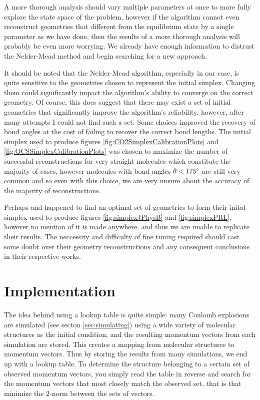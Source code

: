 A more thorough analysis should vary multiple parameters at once to more fully explore the state space of the problem, however if the algorithm cannot even reconstruct geometries that different from the equilibrium state by a single parameter as we have done, then the results of a more thorough analysis will probably be even more worrying. We already have enough information to distrust the Nelder-Mead method and begin searching for a new approach.

It should be noted that the Nelder-Mead algorithm, especially in our case, is quite sensitive to the geometries chosen to represent the initial simplex. Changing them could significantly impact the algorithm's ability to converge on the correct geometry. Of course, this does suggest that there may exist a set of initial geometries that significantly improve the algorithm's reliability, however, after many attempts I could not find such a set. Some choices improved the recovery of bond angles at the cost of failing to recover the correct bond lengths. The initial simplex used to produce figures \ref{fig:CO2SimplexCalibrationPlots} and \ref{fig:OCSSimplexCalibrationPlots} was chosen to maximize the number of successful reconstructions for very straight molecules which constitute the majority of cases, however molecules with bond angles $\theta < 175\degree$ are still very common and so even with this choice, we are very unsure about the accuracy of the majority of reconstructions.


Perhaps \citet{Brichta07} and \citet{Bocharova11} happened to find an optimal set of geometries to form their inital simplex used to produce figures \ref{fig:simplexJPhysB} and \ref{fig:simplexPRL}, however no mention of it is made anywhere, and thus we are unable to replicate their results. The neccessity and difficulty of fine tuning required should cast some doubt over their geometry reconstructions and any consequent conclusions in their respective works.

\section{Implementation}
The idea behind using a lookup table is quite simple: many Coulomb explosions are simulated (see secton \ref{sec:simulating}) using a wide variety of molecular structures as the initial condition, and the resulting momentum vectors from each simulation are stored. This creates a mapping from molecular structures to momentum vectors. Thus by storing the results from many simulations, we end up with a lookup table. To determine the structure belonging to a certain set of observed momentum vectors, you simply read the table in reverse and search for the momentum vectors that most closely match the observed set, that is that minimize the $2$-norm between the sets of vectors.

